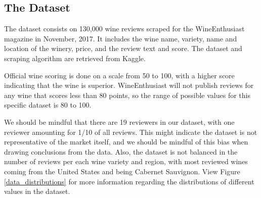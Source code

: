 \documentclass[10pt]{IEEEtran}
\begin{document}
\subsection{The Dataset}
    The dataset consists on 130,000 wine reviews scraped for the WineEnthusiast magazine in November, 2017. It includes the wine name, variety, name and location of the winery, price, and the review text and score. The dataset and scraping algorithm are retrieved from Kaggle\cite{data}. \par
    Official wine scoring is done on a scale from 50 to 100, with a higher score indicating that the wine is superior\cite{wine_scoring}. WineEnthusiast will not publish reviews for any wine that scores less than 80 points, so the range of possible values for this specific dataset is 80 to 100. \par
    We should be mindful that there are 19 reviewers in our dataset, with one reviewer amounting for 1/10 of all reviews. This might indicate the dataset is not representative of the market itself, and we should be mindful of this bias when drawing conclusions from the data. 
    Also, the dataset is not balanced in the number of reviews per each wine variety and region, with most reviewed wines coming from the United States and being Cabernet Sauvignon. View Figure \ref{data_distributions} for more information regarding the distributions of different values in the dataset. \par
\end{document}
